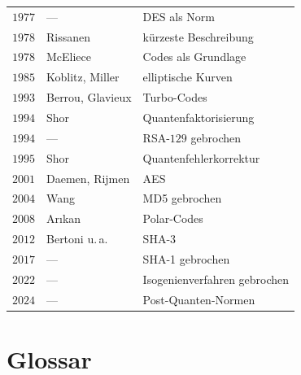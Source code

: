 \begin{merksatz}
\begin{center}
{\begin{tabular}{@{}P{1.4cm}P{2.8cm}P{4.0cm}@{}}
$1977$ & --- & DES als Norm\\
$1978$ & Rissanen & kürzeste Beschreibung\\
$1978$ & McEliece & Codes als Grundlage\\
$1985$ & Koblitz, Miller & elliptische Kurven\\
$1993$ & Berrou, Glavieux & Turbo-Codes\\
$1994$ & Shor & Quantenfaktorisierung\\
$1994$ & --- & RSA-$129$ gebrochen\\
$1995$ & Shor & Quantenfehlerkorrektur\\
$2001$ & Daemen, Rijmen & AES\\
$2004$ & Wang & MD5 gebrochen\\
$2008$ & Arıkan & Polar-Codes\\
$2012$ & Bertoni u.\,a. & SHA-3\\
$2017$ & --- & SHA-1 gebrochen\\
$2022$ & --- & Isogenienverfahren gebrochen\\
$2024$ & --- & Post-Quanten-Normen\\
\bottomrule
\end{tabular}}
\end{center}
\end{merksatz}

\section{Glossar}

